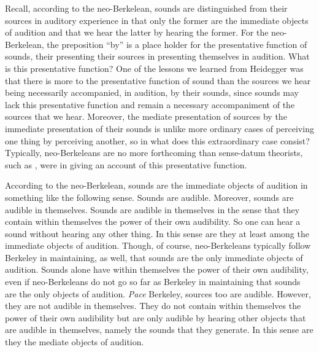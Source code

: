 Recall, according to the neo-Berkelean, sounds are distinguished from their sources in auditory experience in that only the former are the immediate objects of audition and that we hear the latter by hearing the former. For the neo-Berkelean, the preposition ``by'' is a place holder for the presentative function of sounds, their presenting their sources in presenting themselves in audition. What is this presentative function? One of the lessons we learned from Heidegger was that there is more to the presentative function of sound than the sources we hear being necessarily accompanied, in audition, by their sounds, since sounds may lack this presentative function and remain a necessary accompaniment of the sources that we hear. Moreover, the mediate presentation of sources by the immediate presentation of their sounds is unlike more ordinary cases of perceiving one thing by perceiving another, so in what does this extraordinary case consist? Typically, neo-Berkeleans are no more forthcoming than sense-datum theorists, such as \citet{Price:1932fk}, were in giving an account of this presentative function.

According to the neo-Berkelean, sounds are the immediate objects of audition in something like the following sense. Sounds are audible. Moreover, sounds are audible in themselves. Sounds are audible in themselves in the sense that they contain within themselves the power of their own audibility. So one can hear a sound without hearing any other thing. In this sense are they at least among the immediate objects of audition. Though, of course, neo-Berkeleans typically follow Berkeley in maintaining, as well, that sounds are the only immediate objects of audition. Sounds alone have within themselves the power of their own audibility, even if neo-Berkeleans do not go so far as Berkeley in maintaining that sounds are the only objects of audition. \emph{Pace} Berkeley, sources too are audible. However, they are not audible in themselves. They do not contain within themselves the power of their own audibility but are only audible by hearing other objects that are audible in themselves, namely the sounds that they generate. In this sense are they the mediate objects of audition.

